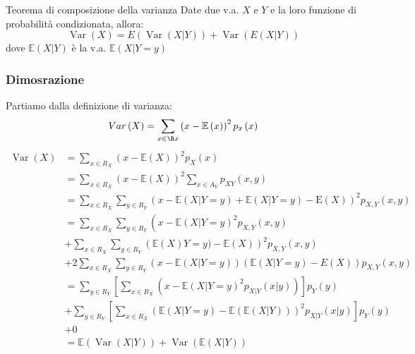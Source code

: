 \begin{teorema}{Teorema di composizione della varianza}
	Date due v.a. $ X $ e $ Y $ e la loro funzione di probabilità condizionata, allora:
	\[
		\operatorname{Var}\left(X\right) = E\left(\operatorname{Var}\left(X|Y\right)\right) + \operatorname{Var} \left(E\left(X|Y\right)\right)
	\]
	dove $ \mathbb{E} \left(X |Y\right)$ è la v.a. $\mathbb{E}\left(X|Y = y\right) $
\end{teorema} \label{Composizione della varianza}
\subsubsection*{Dimosrazione}
Partiamo dalla definizione di varianza:
\[
	Var \left(X\right) = \sum_{x \in \R x} \left(x - \mathbb{E}\left(x\right)\right)^2 p_x\left(x\right)
\]
\begin{align*}
	\operatorname{Var}(X) & =\sum_{x \in R_X}(x-\mathbb{E}(X))^2 p_X(x)                                                                                                                    \\
	                      & =\sum_{x \in R_X}(x-\mathbb{E}(X))^2 \sum_{x \in A_Y} p_{X Y}(x, y)                                                                                            \\
	                      & =\sum_{x \in R_X} \sum_{y \in R_Y}(x-\mathbb{E}(X | Y=y)+\mathbb{E}(X | Y=y) -\mathrm{E}(X))^2 p_{X,Y}(x, y)                                                   \\
	                      & =\sum_{x \in R_X} \sum_{ y \in R_Y}\left(x-\mathbb{E}(X | Y=y)^2 p_{X, Y}(x, y)\right.                                                                         \\
	                      & +\sum_{x \in R_X} \sum_{y \in R_Y}\left(\mathbb{E}(X) Y=y)-\mathbb{E}(X)\right)^2 p_{X,Y} (x, y)                                                               \\
	                      & +2 \sum_{x \in R_X} \sum_{y \in R_Y}\left(x-\mathbb{E}(X | Y=y)\right)(\mathbb{E}(X | Y=y)-E(X))p_{X,Y} \left(x,y\right)                                       \\
	                      & =\sum_{y \in  R_Y}\left[\sum_{x \in R_X}\left(x-\mathbb{E}\left(X | Y=y\right)^2 p_{X| Y}(x | y)\right)\right] p_Y(y)                                          \\
	                      & +\sum_{y \in R_Y}\left[\sum_{x \in  R_X}\left(\mathbb{E}(X | Y=y)-\mathbb{E} \left(\mathbb{E}\left(X | Y\right)\right)\right)^2 p_{X | Y}(x | y)\right] p_Y(y) \\
	                      & +0                                                                                                                                                             \\
	                      & =\mathbb{E}(\operatorname{Var}(X | Y))+\operatorname{Var}(\mathbb{E}(X | Y))                                                                                   \\
	                      &
\end{align*}

